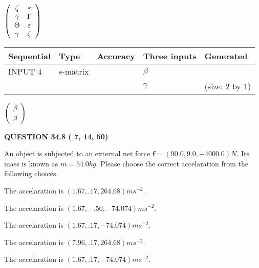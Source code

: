 \documentclass[12pt]{article}
\begin{document}
   
 $  \left( \begin{array}
 {
 c
 c
 }
                    \zeta & 
 \varepsilon \\ 
 \gamma & 
 \Gamma \\ 
 \Theta & 
 \varepsilon \\ 
 \gamma & 
                    \zeta
 \end{array} \right) $ 
  
  
\noindent\begin{tabular}{|l|l|l|l|l|}
\hline
 Sequential & Type & Accuracy & Three inputs & Generated \\ 
\hline
 
 
  INPUT $           4$ & s-matrix & & 
 $  \beta $ & 
  \\
  & & & 
 $  \gamma $ & 
  (size:           2 by           1)
 \\  \hline  
 \end{tabular}
   
   
 $  \left( \begin{array}
 {
 c
 }
 \beta \\ 
 \beta
 \end{array} \right) $ 
  
\vspace{0.2in}
  
{\textbf{\Large{QUESTION
34.8 
 (          7,         14,         50)
}}}
  
  
 
An object is subjected to an external net force $\mathbf{f}=
(90.0 , 9.0 , -4000.0) N$.
Its mass is known as $m= %
54.0 kg$.
Please choose the correct accelaration from the following choices.
 
 
  The accelaration is $  %
(
1.67,
.17,
264.68)
ms^{-2} $.
 
 
  The accelaration is $  %
(
1.67,
-.50,
-74.074)
ms^{-2} $.
 
 
  The accelaration is $  %
(
1.67,
.17,
-74.074)
ms^{-2} $.
 
 
  The accelaration is $  %
(
7.96,
.17,
264.68)
ms^{-2} $.
 
 
\noindent{}
 
 
  The accelaration is $  %
(
1.67,
.17,
-74.074)
ms^{-2} $.
 
 
\noindent{}
 
\end{document}
